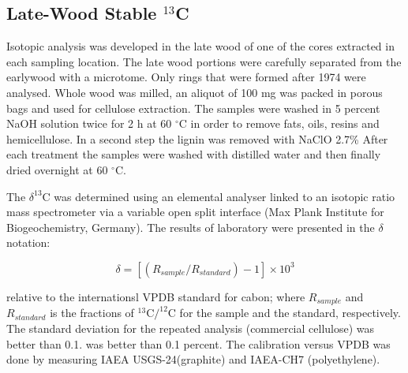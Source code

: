 \documentclass[review,authoryear]{elsarticle}
\begin{document}
\subsection{Late-Wood Stable $^{13}$C}
Isotopic analysis was developed in the late wood of one of the cores
extracted in each sampling location. The late wood portions were
carefully separated from the earlywood with a microtome. Only rings
that were formed after 1974 were analysed. Whole wood was milled, an
aliquot of 100 mg was packed in porous bags and used for cellulose
extraction. The samples were washed in 5 percent NaOH solution twice
for 2 h at 60 $^{\circ}$C in order to remove fats, oils, resins and
hemicellulose. In a second step the lignin was removed with NaClO
2.7\% After each treatment the samples were washed with distilled
water and then finally dried overnight at 60 $^{\circ}$C.

The $\delta^{13}$C was determined using an elemental analyser linked
to an isotopic ratio mass spectrometer via a variable open split
interface (Max Plank Institute for Biogeochemistry, Germany). The
results of laboratory were presented in the $\delta$ notation:

\begin{equation}\label{eq:dC}
\delta = \left [ \left ( R_{sample}/R_{standard} \right )-1 \right ]\times 10^3 
\end{equation}

relative to the internationsl VPDB standard for cabon; where
$R_{sample}$ and $R_{standard}$ is the fractions of $^{13}$C$/^{12}$C
for the sample and the standard, respectively. The standard deviation
for the repeated analysis (commercial cellulose) was better than
0.1. was better than 0.1 percent. The calibration versus VPDB was done
by measuring IAEA USGS-24(graphite) and IAEA-CH7 (polyethylene).

\end{document}
